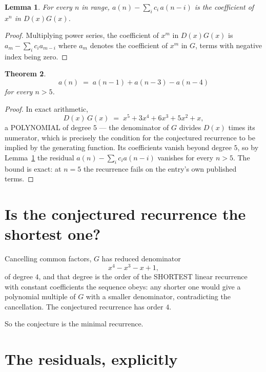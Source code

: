 \documentclass[11pt,a4paper]{article}
\theoremstyle{plain}
\newtheorem{theorem}{Theorem}
\newtheorem{lemma}[theorem]{Lemma}
\theoremstyle{definition}
\begin{document}
\begin{lemma}\label{lem:key}
For every $n$ in range, $a(n)-\sum_i c_i\,a(n-i)$ is the coefficient of $x^{n}$ in
$D(x)G(x)$.
\end{lemma}

\begin{proof}
Multiplying power series, the coefficient of $x^{m}$ in $D(x)G(x)$ is
$a_m-\sum_i c_i a_{m-i}$ where $a_m$ denotes the coefficient of $x^{m}$ in $G$, terms with
negative index being zero.
\end{proof}

\begin{theorem}
\[
a(n)\;=\;a(n-1) + a(n-3) - a(n-4)
\]
for every $n>5$.
\end{theorem}

\begin{proof}
In exact arithmetic,
\[
D(x)\,G(x)\;=\;x^{5} + 3 x^{4} + 6 x^{3} + 5 x^{2} + x,
\]
a POLYNOMIAL of degree $5$ --- the denominator of $G$ divides $D(x)$ times its numerator,
which is precisely the condition for the conjectured recurrence to be implied by the
generating function. Its coefficients vanish beyond degree $5$, so by
Lemma~\ref{lem:key} the residual $a(n)-\sum_ic_ia(n-i)$ vanishes for every
$n>5$. The bound is exact: at $n=5$ the recurrence fails on the entry's own published terms.
\end{proof}

\section{Is the conjectured recurrence the shortest one?}

Cancelling common factors, $G$ has reduced denominator
\[
x^{4} - x^{3} - x + 1,
\]
of degree $4$, and that degree is the order of the SHORTEST linear recurrence with
constant coefficients the sequence obeys: any shorter one would give a polynomial multiple of
$G$ with a smaller denominator, contradicting the cancellation. The conjectured recurrence has
order $4$.

So the conjecture is the minimal recurrence.

\section{The residuals, explicitly}
\end{document}
